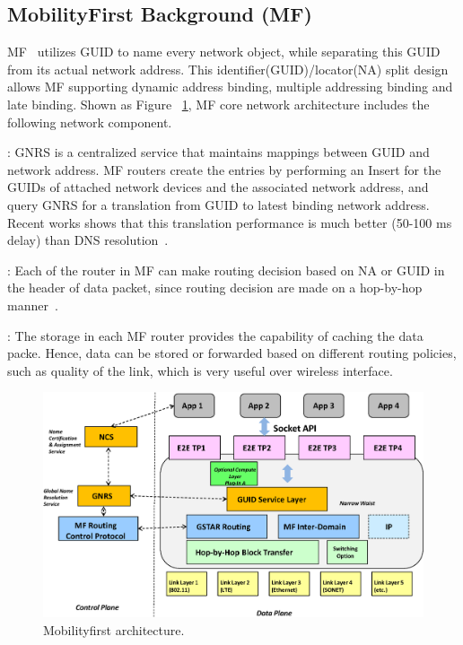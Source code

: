 \subsection{MobilityFirst Background (MF)}\label{sec:intro_mf}
MF~\cite{raychaudhuri2012mobilityfirst} utilizes GUID to name every network object, while separating this GUID from its actual network address. This identifier(GUID)/locator(NA) split design allows MF supporting dynamic address binding, multiple addressing binding and late binding. Shown as Figure ~\ref{fig:mf_arch}, MF core network architecture includes the following network component.

\vspace{1mm}: GNRS is a centralized service that maintains mappings between GUID and network address. MF routers create the entries by performing an Insert for the GUIDs of attached network devices and the associated network address, and query GNRS for a translation from GUID to latest binding network address. Recent works shows that this translation performance is much better (50-100 ms delay) than DNS resolution~\cite{vu2012dmap}.

\vspace{1mm}: Each of the router in MF can make routing decision based on NA or GUID in the header of data packet, since routing decision are made on a hop-by-hop manner~\cite{nelson2011gstar}.

\vspace{1mm}: The storage in each MF router provides the capability of caching the data packe. Hence, data can be stored or forwarded based on different routing policies, such as quality of the link, which is very useful over wireless interface.
\begin{figure}
\centering
\includegraphics[width=\columnwidth]{figure/mf_arch.eps}
\caption{\label{fig:mf_arch}Mobilityfirst architecture.}
\end{figure}

